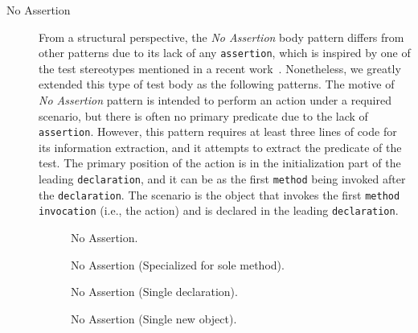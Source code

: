 \documentclass[proposal.tex]{subfiles}
\begin{document}
\begin{description}
\item[No Assertion] 


From a structural perspective, the \textit{No Assertion} body pattern differs from other patterns due to its lack of any \texttt{assertion}, which is inspired by one of the test stereotypes mentioned in a recent work~\cite{li2018aiding}.
%
Nonetheless, we greatly extended this type of test body as the following patterns.
%
The motive of \textit{No Assertion} pattern is intended to perform an action under a required scenario, but there is often no primary predicate due to the lack of \texttt{assertion}.
%
However, this pattern requires at least three lines of code for its information extraction, and it attempts to extract the predicate of the test.
%
The primary position of the action is in the initialization part of the leading \texttt{declaration}, and it can be as the first \texttt{method} being invoked after the \texttt{declaration}.
%
The scenario is the object that invokes the first \texttt{method invocation} (i.e., the action) and is declared in the leading \texttt{declaration}.

\begin{figure}[t]
\centering
    \begin{subfigure}{0.7\textwidth}
    \end{subfigure}
\caption{No Assertion.}
\label{NoAstP}
\end{figure}

\begin{figure}[H]
\centering
    \begin{subfigure}{0.6\textwidth}
    \end{subfigure}
\caption{No Assertion (Specialized for sole method).}
\label{NoAstP_one}
\end{figure}

\begin{figure}[H]
\centering
    \begin{subfigure}{0.7\textwidth}
    \end{subfigure}
\caption{No Assertion (Single declaration).}
\label{NoAstP_SD}
\end{figure}

\begin{figure}[H]
\centering
    \begin{subfigure}{0.75\textwidth}
    \end{subfigure}
\caption{No Assertion (Single new object).}
\label{NoAstP_new}
\end{figure}


\end{description}
\end{document}

